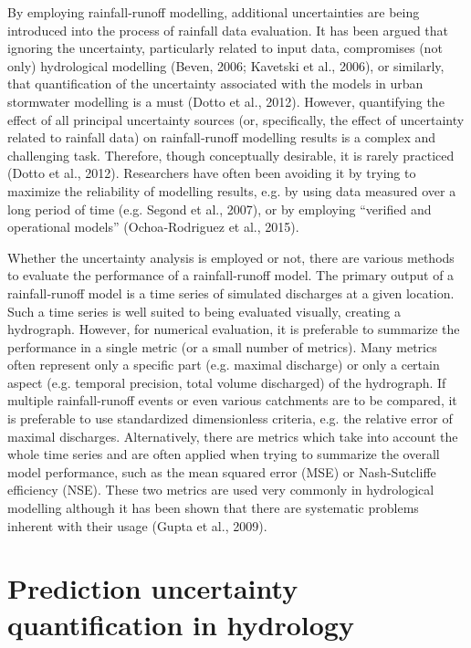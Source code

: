 \documentclass{ctuthesis}\usepackage[]{graphicx}\usepackage[]{color}
\begin{document}
By employing rainfall‐runoff modelling, additional uncertainties are being introduced into the process
of rainfall data evaluation. It has been argued that ignoring the uncertainty, particularly related to
input data, compromises (not only) hydrological modelling (Beven, 2006; Kavetski et al., 2006), or
similarly, that quantification of the uncertainty associated with the models in urban stormwater
modelling is a must (Dotto et al., 2012). However, quantifying the effect of all principal uncertainty sources (or, specifically, the effect of
uncertainty related to rainfall data) on rainfall‐runoff modelling results is a complex and challenging
task. Therefore, though conceptually desirable, it is rarely practiced (Dotto et al., 2012). Researchers
have often been avoiding it by trying to maximize the reliability of modelling results, e.g. by using
data measured over a long period of time (e.g. Segond et al., 2007), or by employing “verified and
operational models” (Ochoa‐Rodriguez et al., 2015).

Whether the uncertainty analysis is employed or not, there are various methods to evaluate the
performance of a rainfall‐runoff model. The primary output of a rainfall‐runoff model is a time series
of simulated discharges at a given location. Such a time series is well suited to being evaluated
visually, creating a hydrograph. However, for numerical evaluation, it is preferable to summarize the
performance in a single metric (or a small number of metrics). Many metrics often represent only a
specific part (e.g. maximal discharge) or only a certain aspect (e.g. temporal precision, total volume
discharged) of the hydrograph. If multiple rainfall‐runoff events or even various catchments are to be
compared, it is preferable to use standardized dimensionless criteria, e.g. the relative error of
maximal discharges. Alternatively, there are metrics which take into account the whole time series
and are often applied when trying to summarize the overall model performance, such as the mean
squared error (MSE) or Nash‐Sutcliffe efficiency (NSE). These two metrics are used very commonly in hydrological modelling although it has been shown
that there are systematic problems inherent with their usage (Gupta et al., 2009).



\section{Prediction uncertainty quantification in hydrology} \label{PredUncQuant}
\end{document}
